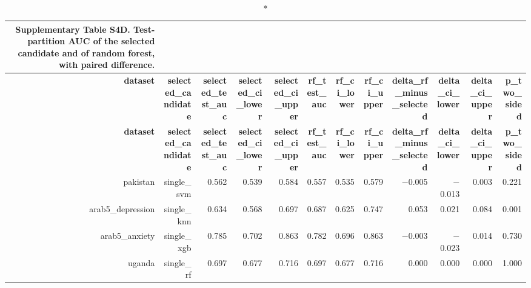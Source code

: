 \documentclass[10pt]{article}
\begin{document}
\tiny
\setlength{\tabcolsep}{2pt}
\begin{longtable}{rrrrrrrrrrrr}
\caption*{\textbf{Supplementary Table S4D.} Test-partition AUC of the selected candidate and of random forest, with paired difference.}\\
\toprule
\textbf{dataset} & \textbf{selected\_candidate} & \textbf{selected\_test\_auc} & \textbf{selected\_ci\_lower} & \textbf{selected\_ci\_upper} & \textbf{rf\_test\_auc} & \textbf{rf\_ci\_lower} & \textbf{rf\_ci\_upper} & \textbf{delta\_rf\_minus\_selected} & \textbf{delta\_ci\_lower} & \textbf{delta\_ci\_upper} & \textbf{p\_two\_sided} \\
\midrule
\endfirsthead
\toprule
\textbf{dataset} & \textbf{selected\_candidate} & \textbf{selected\_test\_auc} & \textbf{selected\_ci\_lower} & \textbf{selected\_ci\_upper} & \textbf{rf\_test\_auc} & \textbf{rf\_ci\_lower} & \textbf{rf\_ci\_upper} & \textbf{delta\_rf\_minus\_selected} & \textbf{delta\_ci\_lower} & \textbf{delta\_ci\_upper} & \textbf{p\_two\_sided} \\
\midrule
\endhead
\bottomrule
\endfoot
pakistan & single\_svm & 0.562 & 0.539 & 0.584 & 0.557 & 0.535 & 0.579 & $-$0.005 & $-$0.013 & 0.003 & 0.221 \\
arab5\_depression & single\_knn & 0.634 & 0.568 & 0.697 & 0.687 & 0.625 & 0.747 & 0.053 & 0.021 & 0.084 & 0.001 \\
arab5\_anxiety & single\_xgb & 0.785 & 0.702 & 0.863 & 0.782 & 0.696 & 0.863 & $-$0.003 & $-$0.023 & 0.014 & 0.730 \\
uganda & single\_rf & 0.697 & 0.677 & 0.716 & 0.697 & 0.677 & 0.716 & 0.000 & 0.000 & 0.000 & 1.000 \\
\bottomrule
\end{longtable}
\normalsize
\end{document}
